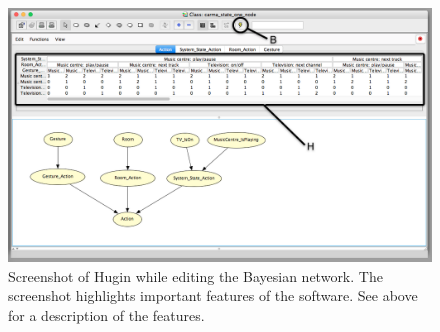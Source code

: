 \begin{figure}[h!]
\centering
\includegraphics[width=\textwidth]{images/hugin-functionality-editing}
\caption{Screenshot of Hugin while editing the Bayesian network. The screenshot highlights important features of the software. See above for a description of the features.}
\label{fig:design:bayesian-network:hugin-functionality-editing}
\end{figure}

